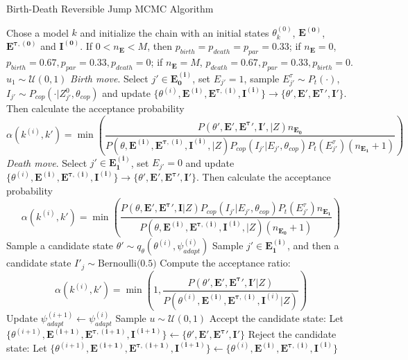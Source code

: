 \begin{algorithm}[H]
\caption{Birth-Death Reversible Jump MCMC Algorithm}
\label{alg:rjmcmc_B}
\begin{algorithmic}[1]
    \State Chose a model $k$ and initialize the chain with an initial states $\theta^{(0)}_{k}$, $\mathbf{E^{(0)}}$, $\mathbf{E^{\tau, (0)}}$ and $\mathbf{I^{(0)}}$. If $0 < n_\mathbf{E} < M$, then $p_{birth} = p_{death} = p_{par} = 0.33$; if $n_\mathbf{E} = 0$, $p_{birth} = 0.67, p_{par} = 0.33, p_{death} = 0$; if $n_\mathbf{E} = M$, $p_{death} = 0.67, p_{par} = 0.33, p_{birth} = 0$.
    	\State $u_1 \sim \mathcal{U}(0, 1)$  
	 	\State \textit{Birth move}. Select $j' \in \mathbf{E^{(i)}_0}$, set $E_{j'} = 1$, sample $E^\tau_{j'} \sim P_t(\cdot)$, $I_{j'}\sim P_{cop}(\cdot | Z_{j'}^0, \theta_{cop})$ and update $\{\theta^{(i)}, \mathbf{E^{(i)}}, \mathbf{E^{\tau, (i)}}, \mathbf{I^{(i)}}\} \rightarrow \{\theta', \mathbf{E}', \mathbf{E^\tau}', \mathbf{I}'\}$. Then calculate the acceptance probability 
		$$\alpha(k^{(i)}, k') = \min\left(\frac{P(\theta', \mathbf{E}', \mathbf{E^\tau}', \mathbf{I}', | Z)n_{\mathbf{E_0}}}{P(\theta, \mathbf{E^{(i)}}, \mathbf{E^{\tau, (i)}}, \mathbf{I^{(i)}}, | Z)P_{cop}(I_{j'} | E_{j'}, \theta_{cop})P_t(E^\tau_{j'})(n_{\mathbf{E_1}} + 1)} \right)$$
		\State \textit{Death move}. Select $j' \in \mathbf{E^{(i)}_1}$, set $E_{j'} = 0$ and update $\{\theta^{(i)}, \mathbf{E^{(i)}}, \mathbf{E^{\tau, (i)}}, \mathbf{I^{(i)}}\} \rightarrow \{\theta', \mathbf{E}', \mathbf{E^\tau}', \mathbf{I}'\}$. Then calculate the acceptance probability 
$$\alpha(k^{(i)}, k') = \min\left(\frac{P(\theta, \mathbf{E}', \mathbf{E^{\tau}}', \mathbf{I} | Z)P_{cop}(I_{j'} | E_{j'}, \theta_{cop})P_t(E^\tau_{j'})n_{\mathbf{E_1}}}{P(\theta, \mathbf{E^{(i)}}, \mathbf{E^{\tau, (i)}}, \mathbf{I^{(i)}}, | Z)(n_{\mathbf{E_0}} + 1)} \right)$$
	\Else
 	\State Sample a candidate state $\theta' \sim q_\theta(\theta^{(i)}, \psi^{(i)}_{adapt})$
    	\State Sample  $j' \in \mathbf{E^{(i)}_1}$, and then a candidate state $I'_j \sim \text{Bernoulli(0.5)}$
    	    \State Compute the acceptance ratio:
        		\[
        \alpha(k^{(i)}, k') = \min\left(1, \frac{P(\theta', \mathbf{E}', \mathbf{E^{\tau}}', \mathbf{I}'|Z)}{P(\theta^{(i)}, \mathbf{E^{(i)}}, \mathbf{E^{\tau, (i)}}, \mathbf{I}^{(i)}|Z)} \right)
        			\]
	\State Update $ \psi^{(i + 1)}_{adapt} \leftarrow \psi^{(i)}_{adapt}$
        \EndIf 
		   \State Sample $u \sim \mathcal{U}(0, 1)$
            			\State Accept the candidate state: Let $\{\theta^{(i+1)}, \mathbf{E^{(i+1)}}, \mathbf{E^{\tau, (i+1)}}, \mathbf{I^{(i+1)}}\} \leftarrow \{\theta', \mathbf{E}', \mathbf{E^\tau}', \mathbf{I}'\}$
			\Else
				\State Reject the candidate state: Let $\{\theta^{(i+1)}, \mathbf{E^{(i+1)}}, \mathbf{E^{\tau, (i+1)}}, \mathbf{I^{(i+1)}}\} \leftarrow \{\theta^{(i)}, \mathbf{E^{(i)}}, \mathbf{E^{\tau, (i)}}, \mathbf{I^{(i)}}\}$

			\EndIf        

    \EndFor
\end{algorithmic}
\end{algorithm}

